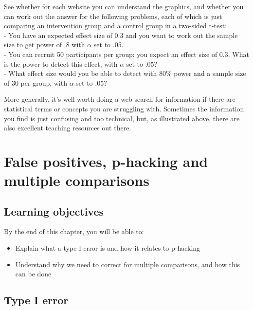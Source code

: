 \documentclass{krantz}
\begin{document}
See whether for each website you can understand the graphics, and whether you can work out the answer for the following problems, each of which is just comparing an intervention group and a control group in a two-sided t-test:\\
- You have an expected effect size of 0.3 and you want to work out the sample size to get power of .8 with \(\alpha\) set to .05.\\
- You can recruit 50 participants per group; you expect an effect size of 0.3. What is the power to detect this effect, with \(\alpha\) set to .05?\\
- What effect size would you be able to detect with 80\% power and a sample size of 30 per group, with \(\alpha\) set to .05?

More generally, it's well worth doing a web search for information if there are statistical terms or concepts you are struggling with. Sometimes the information you find is just confusing and too technical, but, as illustrated above, there are also excellent teaching resources out there.

\hypertarget{phacking}{%
\chapter{False positives, p-hacking and multiple comparisons}\label{phacking}}

\hypertarget{learning-objectives-12}{%
\section{Learning objectives}\label{learning-objectives-12}}

By the end of this chapter, you will be able to:

\begin{itemize}
\item
  Explain what a type I error is and how it relates to p-hacking
\item
  Understand why we need to correct for multiple comparisons, and how this can be done
\end{itemize}

\hypertarget{type-i-error}{%
\section{Type I error}\label{type-i-error}}
\end{document}
